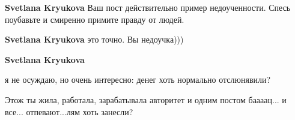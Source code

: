 \begin{itemize}
\begin{itemize}
 
\textbf{Svetlana Kryukova} Ваш пост действительно пример недоученности. Спесь поубавьте и смиренно примите правду от людей.

 
\textbf{Svetlana Kryukova} это точно. Вы недоучка)))

 
\textbf{Svetlana Kryukova} 

я не осуждаю, но очень интересно: денег хоть нормально отслюнявили?

Этож ты жила, работала, зарабатывала авторитет и одним постом баааац... и все...
отпевают...лям хоть занесли?

\end{itemize}

\end{itemize}

